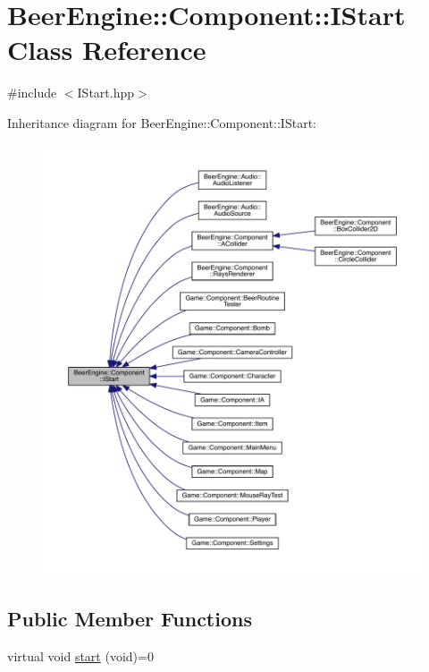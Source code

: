 \hypertarget{class_beer_engine_1_1_component_1_1_i_start}{}\section{Beer\+Engine\+:\+:Component\+:\+:I\+Start Class Reference}
\label{class_beer_engine_1_1_component_1_1_i_start}


{\ttfamily \#include $<$I\+Start.\+hpp$>$}



Inheritance diagram for Beer\+Engine\+:\+:Component\+:\+:I\+Start\+:
\nopagebreak
\begin{figure}[H]
\begin{center}
\leavevmode
\includegraphics[width=350pt]{class_beer_engine_1_1_component_1_1_i_start__inherit__graph}
\end{center}
\end{figure}
\subsection*{Public Member Functions}
\begin{DoxyCompactItemize}
\item 
virtual void \mbox{\hyperlink{class_beer_engine_1_1_component_1_1_i_start_aa3e25e86e20c46cdaefc6f6d7f21e495}{start}} (void)=0
\end{DoxyCompactItemize}


